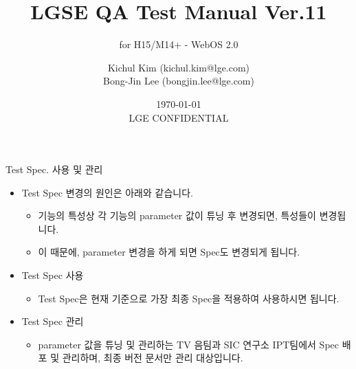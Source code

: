 \documentclass{beamer}
\title[WebOS 2.0 QA spec \alert{LGE CONFIDENTIAL}] %
{LGSE QA Test Manual Ver.11}
\subtitle
{for H15/M14+ - WebOS 2.0} %
\author[Kichul Kim, Bong-Jin Lee] %
{Kichul Kim (kichul.kim@lge.com)\\Bong-Jin Lee (bongjin.lee@lge.com)}
\institute[IPT team, SIC lab., LG Electronics] %
{
  IPT team, SIC lab., LG Electronics \\
  Release Link: (http://collab.lge.com/main/x/jLbjCQ)
  }
\date[Short Occasion] %
{\today\\ \alert{LGE CONFIDENTIAL}}
\begin{document}
\begin{frame}
  \titlepage
\end{frame}


\begin{frame}[t]{Test Spec. 사용 및 관리}

 \begin{itemize}
 \item Test Spec 변경의 원인은 아래와 같습니다.
 	\begin{itemize}
	\item 기능의 특성상 각 기능의 parameter 값이 튜닝 후 변경되면, 특성들이 변경됩니다.
	\item 이 때문에, parameter 변경을 하게 되면 Spec도 변경되게 됩니다.
	\end{itemize}
\end{itemize}

 \begin{itemize}
 \item Test Spec 사용
 	\begin{itemize}
 	\item Test Spec은 현재 기준으로 가장 최종 Spec을 적용하여 사용하시면 됩니다.
	\end{itemize}
\end{itemize}

 \begin{itemize}
 \item Test Spec 관리
 	\begin{itemize}
 	\item parameter 값을 튜닝 및 관리하는 TV 음팀과 SIC 연구소 IPT팀에서 Spec 배포 및 관리하며, 최종 버전 문서만 관리 대상입니다.
	\end{itemize}
\end{itemize}

\end{frame}
\end{document}

